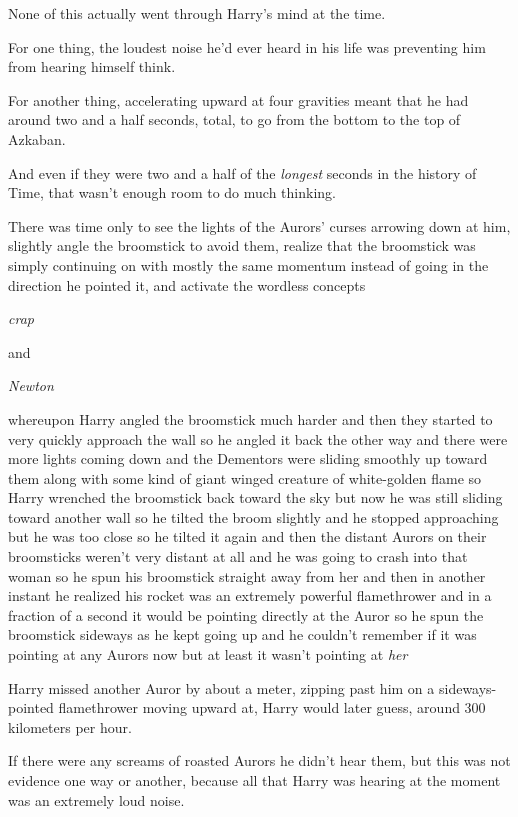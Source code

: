 None of this actually went through Harry's mind at the time.

For one thing, the loudest noise he'd ever heard in his life was preventing him
from hearing himself think.

For another thing, accelerating upward at four gravities meant that he had
around two and a half seconds, total, to go from the bottom to the top of
Azkaban.

And even if they were two and a half of the \emph{longest} seconds in the
history of Time, that wasn't enough room to do much thinking.

There was time only to see the lights of the Aurors' curses arrowing down at
him, slightly angle the broomstick to avoid them, realize that the broomstick
was simply continuing on with mostly the same momentum instead of going in the
direction he pointed it, and activate the wordless concepts

\emph{crap}

and

\emph{Newton}

whereupon Harry angled the broomstick much harder and then they started to very
quickly approach the wall so he angled it back the other way and there were
more lights coming down and the Dementors were sliding smoothly up toward them
along with some kind of giant winged creature of white-golden flame so Harry
wrenched the broomstick back toward the sky but now he was still sliding toward
another wall so he tilted the broom slightly and he stopped approaching but he
was too close so he tilted it again and then the distant Aurors on their
broomsticks weren't very distant at all and he was going to crash into that
woman so he spun his broomstick straight away from her and then in another
instant he realized his rocket was an extremely powerful flamethrower and in a
fraction of a second it would be pointing directly at the Auror so he spun the
broomstick sideways as he kept going up and he couldn't remember if it was
pointing at any Aurors now but at least it wasn't pointing at \emph{her}

Harry missed another Auror by about a meter, zipping past him on a
sideways-pointed flamethrower moving upward at, Harry would later guess, around
300 kilometers per hour.

If there were any screams of roasted Aurors he didn't hear them, but this was
not evidence one way or another, because all that Harry was hearing at the
moment was an extremely loud noise.

